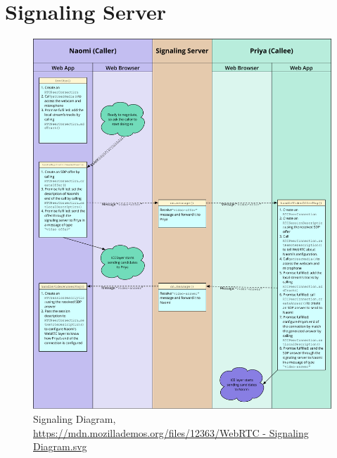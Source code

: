 \section{Signaling Server}

\begin{figure}[H]
	\includegraphics[width=1\textwidth]{images/SignalingDiagram.pdf}
	\centering
	\caption{Signaling Diagram, \url{https://mdn.mozillademos.org/files/12363/WebRTC - Signaling Diagram.svg}}
	\label{fig:Signaling Diagram}
\end{figure}